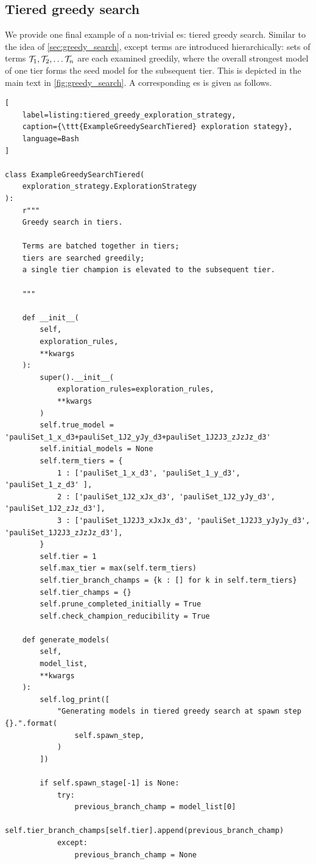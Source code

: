 \subsection{Tiered greedy search}
We provide one final example of a non-trivial \gls{es}: 
    tiered greedy search. 
Similar to the idea of \cref{sec:greedy_search}, 
    except terms are introduced hierarchically:
    sets of terms $\mathcal{T}_1, \mathcal{T}_2, \dots \mathcal{T}_n$ 
    are each examined greedily, where the overall strongest model of one tier 
    forms the seed model for the subsequent tier. 
This is depicted in the main text in \cref{fig:greedy_search}. 
A corresponding \gls{es} is given as follows. 

\begin{lstlisting}[
    label=listing:tiered_greedy_exploration_strategy,
    caption={\ttt{ExampleGreedySearchTiered} exploration stategy},
    language=Bash
]

class ExampleGreedySearchTiered(
    exploration_strategy.ExplorationStrategy
):
    r"""
    Greedy search in tiers.

    Terms are batched together in tiers; 
    tiers are searched greedily; 
    a single tier champion is elevated to the subsequent tier. 

    """

    def __init__(
        self,
        exploration_rules,
        **kwargs
    ):
        super().__init__(
            exploration_rules=exploration_rules,
            **kwargs
        )
        self.true_model = 'pauliSet_1_x_d3+pauliSet_1J2_yJy_d3+pauliSet_1J2J3_zJzJz_d3'
        self.initial_models = None
        self.term_tiers = {
            1 : ['pauliSet_1_x_d3', 'pauliSet_1_y_d3', 'pauliSet_1_z_d3' ],
            2 : ['pauliSet_1J2_xJx_d3', 'pauliSet_1J2_yJy_d3', 'pauliSet_1J2_zJz_d3'],
            3 : ['pauliSet_1J2J3_xJxJx_d3', 'pauliSet_1J2J3_yJyJy_d3', 'pauliSet_1J2J3_zJzJz_d3'],
        }
        self.tier = 1
        self.max_tier = max(self.term_tiers)
        self.tier_branch_champs = {k : [] for k in self.term_tiers} 
        self.tier_champs = {}
        self.prune_completed_initially = True
        self.check_champion_reducibility = True

    def generate_models(
        self,
        model_list,
        **kwargs
    ):
        self.log_print([
            "Generating models in tiered greedy search at spawn step {}.".format(
                self.spawn_step, 
            )
        ])

        if self.spawn_stage[-1] is None:
            try:
                previous_branch_champ = model_list[0]
                self.tier_branch_champs[self.tier].append(previous_branch_champ)
            except:
                previous_branch_champ = None


\end{lstlisting}
